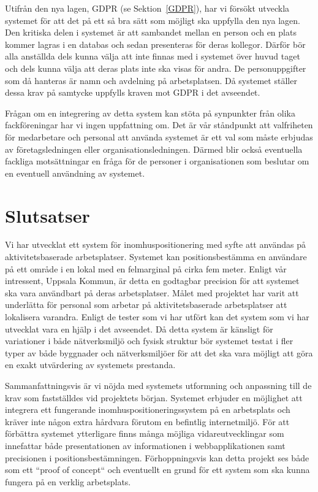 \documentclass[a4paper,12pt]{article}
\begin{document}
Utifrån den nya lagen, GDPR (se Sektion~\ref{GDPR}), har vi försökt utveckla systemet för att det på ett så bra sätt som möjligt ska uppfylla den nya lagen.  Den kritiska delen i systemet är att sambandet mellan en person och en plats kommer lagras i en databas och sedan presenteras för deras kollegor. Därför bör alla anställda dels kunna välja att inte finnas med i systemet över huvud taget och dels kunna välja att deras plats inte ska visas för andra. De personuppgifter som då hanteras är namn och avdelning på arbetsplatsen. Då systemet ställer dessa krav på samtycke uppfylls kraven mot GDPR i det avseendet.

Frågan om en integrering av detta system kan stöta på synpunkter från olika \\fackföreningar har vi ingen uppfattning om. Det är vår ståndpunkt att valfriheten för medarbetare och personal att använda systemet är ett val som måste erbjudas av företagsledningen eller organisationsledningen. Därmed blir också eventuella fackliga motsättningar en fråga för de personer i organisationen som beslutar om en eventuell användning av systemet.



\section{Slutsatser}

Vi har utvecklat ett system för inomhuspositionering med syfte att användas på aktivitetsbaserade arbetsplatser. Systemet kan positionsbestämma en användare på ett område i en lokal med en felmarginal på cirka fem meter. Enligt vår intressent, Uppsala Kommun, är detta en godtagbar precision för att systemet ska vara användbart på deras arbetsplatser. Målet med projektet har varit att underlätta för personal som arbetar på aktivitetsbaserade arbetsplatser att lokalisera varandra. Enligt de tester som vi har utfört kan det system som vi har utvecklat vara en hjälp i det avseendet.
Då detta system är känsligt för variationer i både nätverksmiljö och fysisk struktur bör systemet testat i fler typer av både byggnader och nätverksmiljöer för att det ska vara möjligt att göra en exakt utvärdering av systemets prestanda.

Sammanfattningsvis är vi nöjda med systemets utformning och anpassning till de krav som fastställdes vid projektets början. Systemet erbjuder en möjlighet att integrera ett fungerande inomhuspositioneringssystem på en arbetsplats och kräver inte någon extra hårdvara förutom en befintlig internetmiljö. För att förbättra systemet ytterligare finns många möjliga vidareutvecklingar som innefattar både presentationen av informationen i webbapplikationen samt precisionen i positionsbestämningen. Förhoppningsvis kan detta projekt ses både som ett ``proof of concept`` och eventuellt en grund för ett system som ska kunna fungera på en verklig arbetsplats.
\end{document}
